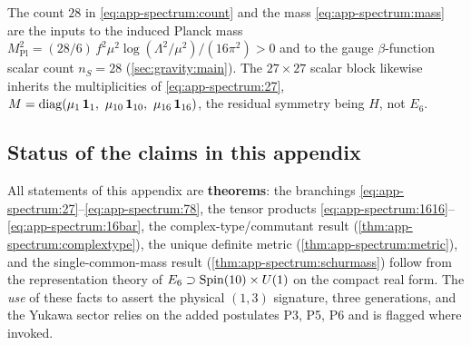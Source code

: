\begin{remark}\label{rem:app-spectrum:downstream}
The count $28$ in \eqref{eq:app-spectrum:count} and the mass
\eqref{eq:app-spectrum:mass} are the inputs to the induced Planck mass
$M_{\mathrm{Pl}}^2=(28/6)\,f^2\mu^2\log(\Lambda^2/\mu^2)/(16\pi^2)>0$ and
to the gauge $\beta$-function scalar count $n_S=28$
(\autoref{sec:gravity:main}). The $27\times27$ scalar block likewise
inherits the multiplicities of \eqref{eq:app-spectrum:27},
$M=\operatorname{diag}(\mu_1\,\mathbf 1_1,\ \mu_{10}\,\mathbf 1_{10},\
\mu_{16}\,\mathbf 1_{16})$, the residual symmetry being $H$, not $E_6$.
\end{remark}

\subsection*{Status of the claims in this appendix}
\label{sec:app-spectrum:status}

All statements of this appendix are \textbf{theorems}: the branchings
\eqref{eq:app-spectrum:27}--\eqref{eq:app-spectrum:78}, the tensor
products \eqref{eq:app-spectrum:1616}--\eqref{eq:app-spectrum:16bar}, the
complex-type/commutant result (\autoref{thm:app-spectrum:complextype}),
the unique definite metric (\autoref{thm:app-spectrum:metric}), and the
single-common-mass result (\autoref{thm:app-spectrum:schurmass}) follow
from the representation theory of $E_6\supset\operatorname{Spin}(10)\times U(1)$ on the
compact real form. The \emph{use} of these facts to assert the physical
$(1,3)$ signature, three generations, and the Yukawa sector relies on the
added postulates P3, P5, P6 and is flagged where invoked.
